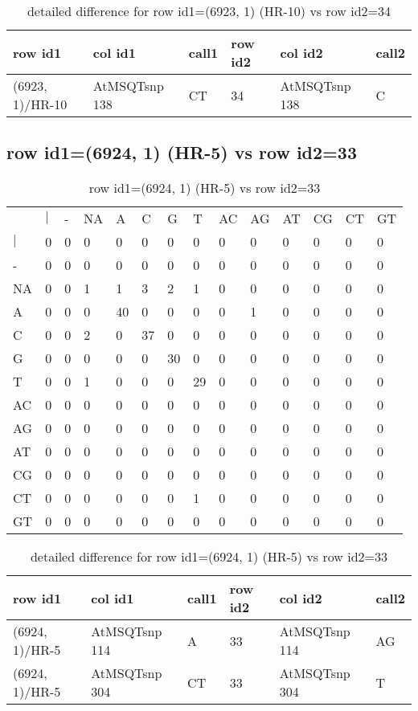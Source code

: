 \begin{center}
\begin{longtable}{|l|l|l|l|l|l|}
\caption{detailed difference for row id1=(6923, 1) (HR-10) vs row id2=34} \label{table_dm113}\\
\hline
row id1&col id1&call1&row id2&col id2&call2\\
\hline
(6923, 1)/HR-10&AtMSQTsnp 138&CT&34&AtMSQTsnp 138&C\\
\hline
\end{longtable}
\end{center}

\subsection{row id1=(6924, 1) (HR-5) vs row id2=33}
\begin{center}
\begin{longtable}{|l|l|l|l|l|l|l|l|l|l|l|l|l|l|}
\caption{row id1=(6924, 1) (HR-5) vs row id2=33} \label{table_dm114}\\
\hline
\\
\hline
&$|$&-&NA&A&C&G&T&AC&AG&AT&CG&CT&GT\\
$|$&0&0&0&0&0&0&0&0&0&0&0&0&0\\
-&0&0&0&0&0&0&0&0&0&0&0&0&0\\
NA&0&0&1&1&3&2&1&0&0&0&0&0&0\\
A&0&0&0&40&0&0&0&0&1&0&0&0&0\\
C&0&0&2&0&37&0&0&0&0&0&0&0&0\\
G&0&0&0&0&0&30&0&0&0&0&0&0&0\\
T&0&0&1&0&0&0&29&0&0&0&0&0&0\\
AC&0&0&0&0&0&0&0&0&0&0&0&0&0\\
AG&0&0&0&0&0&0&0&0&0&0&0&0&0\\
AT&0&0&0&0&0&0&0&0&0&0&0&0&0\\
CG&0&0&0&0&0&0&0&0&0&0&0&0&0\\
CT&0&0&0&0&0&0&1&0&0&0&0&0&0\\
GT&0&0&0&0&0&0&0&0&0&0&0&0&0\\
\hline
\end{longtable}
\end{center}

\begin{center}
\begin{longtable}{|l|l|l|l|l|l|}
\caption{detailed difference for row id1=(6924, 1) (HR-5) vs row id2=33} \label{table_dm115}\\
\hline
row id1&col id1&call1&row id2&col id2&call2\\
\hline
(6924, 1)/HR-5&AtMSQTsnp 114&A&33&AtMSQTsnp 114&AG\\
(6924, 1)/HR-5&AtMSQTsnp 304&CT&33&AtMSQTsnp 304&T\\
\hline
\end{longtable}
\end{center}


